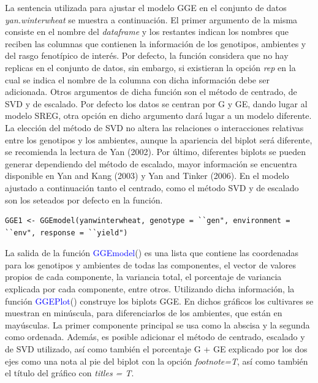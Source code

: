La sentencia utilizada para ajustar el modelo GGE en el conjunto de datos \emph{yan.winterwheat} se muestra a continuación. El primer argumento de la misma consiste en el nombre del \emph{dataframe} y los restantes indican los nombres que reciben las columnas que contienen la información de los genotipos, ambientes y del rasgo fenotípico de interés. Por defecto, la función considera que no hay replicas en el conjunto de datos, sin embargo, si existieran la opción \emph{rep} en la cual se indica el nombre de la columna con dicha información debe ser adicionada. Otros argumentos de dicha función son el método de centrado, de SVD y de escalado. Por defecto los datos se centran por G y GE, dando lugar al modelo SREG, otra opción en dicho argumento dará lugar a un modelo diferente. La elección del método de SVD no altera las relaciones o interacciones relativas entre los genotipos y los ambientes, aunque la apariencia del biplot será diferente, se recomienda la lectura de Yan (2002). Por último, diferentes biplots se pueden generar dependiendo del método de escalado, mayor información se encuentra disponible en Yan and Kang (2003) y Yan and Tinker (2006). En el modelo ajustado a continuación tanto el centrado, como el método SVD y de escalado son los seteados por defecto en la función.

\begin{tcolorbox}[colframe=aurometalsaurus,colback=backcolour,colbacklower=white,
   				width=1\linewidth,
    			height=0.1\linewidth,
    			boxsep=-3mm]
\begin{lstlisting}
GGE1 <- GGEmodel(yanwinterwheat, genotype = ``gen", environment = ``env", response = ``yield")
\end{lstlisting}
\end{tcolorbox}

La salida de la función \textcolor{blue}{GGEmodel}() es una lista que contiene las coordenadas para los genotipos y ambientes de todas las componentes, el vector de valores propios de cada componente, la variancia total, el porcentaje de variancia explicada por cada componente, entre otros. Utilizando dicha información, la función \textcolor{blue}{GGEPlot}() construye los biplots GGE. En dichos gráficos los cultivares se muestran en minúscula, para diferenciarlos de los ambientes, que están en mayúsculas. La primer componente principal se usa como la abscisa y la segunda como ordenada. Además, es posible adicionar el método de centrado, escalado y de SVD utilizado, así como también el porcentaje G + GE explicado por los dos ejes como una nota al pie del biplot con la opción \emph{footnote=T}, así como también el título del gráfico con \emph{titles = T}.


